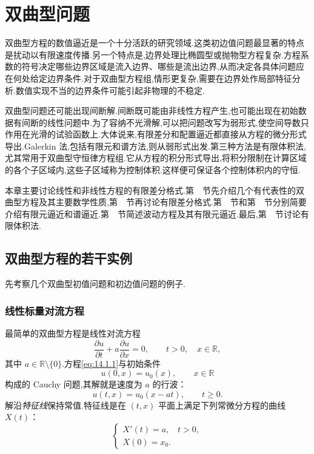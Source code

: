 \chapter{双曲型问题}\label{ch:14}

双曲型方程的数值逼近是一个十分活跃的研究领域.这类初边值问题最显著的特点是扰动以有限速度传播.另一个特点是,边界处理比椭圆型或抛物型方程复杂.方程系数的符号决定哪些边界区域是流入边界、哪些是流出边界,从而决定各具体问题应在何处给定边界条件.对于双曲型方程组,情形更复杂,需要在边界处作局部特征分析.数值实现不当的边界条件可能引起非物理的不稳定.

双曲型问题还可能出现间断解.间断既可能由非线性方程产生,也可能出现在初始数据有间断的线性问题中.为了容纳不光滑解,可以把问题改写为弱形式,使空间导数只作用在光滑的试验函数上.大体说来,有限差分和配置逼近都直接从方程的微分形式导出.Galerkin 法,包括有限元和谱方法,则从弱形式出发.第三种方法是有限体积法,尤其常用于双曲型守恒律方程组.它从方程的积分形式导出,将积分限制在计算区域的各个子区域内,这些子区域称为控制体积.这样便可保证各个控制体积内的守恒.

本章主要讨论线性和非线性方程的有限差分格式.第~~节先介绍几个有代表性的双曲型方程及其主要数学性质,第~~节再讨论有限差分格式.第~~节和第~~节分别简要介绍有限元逼近和谱逼近.第~~节简述波动方程及其有限元逼近.最后,第~~节讨论有限体积法.

\section{双曲型方程的若干实例}\label{sec:14.1}

先考察几个双曲型初值问题和初边值问题的例子.

\subsection{线性标量对流方程}\label{sec:14.1.1}

\begin{example}[线性对流方程]\label{ex:14.1.advection}
最简单的双曲型方程是线性对流方程
\begin{equation}\label{eq:14.1.1}
  \frac{\partial u}{\partial t}+a\frac{\partial u}{\partial x}=0,
      \qquad t>0,\quad x\in\mathbb R,
\end{equation}
其中 \(a\in\mathbb R\setminus\{0\}\).方程\eqref{eq:14.1.1}与初始条件
\begin{equation}\label{eq:14.1.2}
  u(0,x)=u_0(x),\qquad x\in\mathbb R
\end{equation}
构成的 Cauchy 问题,其解就是速度为 \(a\) 的行波：
\[
  u(t,x)=u_0(x-at),\qquad t\ge0.
\]
解沿\emph{特征线}保持常值.特征线是在 \((t,x)\) 平面上满足下列常微分方程的曲线 \(X(t)\)：
\[
  \begin{cases}
    X'(t)=a, & t>0,\\
    X(0)=x_0.
  \end{cases}
\]
\end{example}

